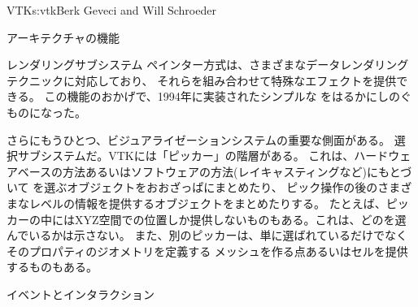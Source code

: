 \begin{aosachapter}{VTK}{s:vtk}{Berk Geveci and Will Schroeder}
\begin{aosasect1}{アーキテクチャの機能}
\begin{aosasect2}{レンダリングサブシステム}
ペインター方式は、さまざまなデータレンダリングテクニックに対応しており、
それらを組み合わせて特殊なエフェクトを提供できる。
この機能のおかげで、1994年に実装されたシンプルな
をはるかにしのぐものになった。

さらにもうひとつ、ビジュアライゼーションシステムの重要な側面がある。
選択サブシステムだ。VTKには「ピッカー」の階層がある。
これは、ハードウェアベースの方法あるいはソフトウェアの方法(レイキャスティングなど)にもとづいて
を選ぶオブジェクトをおおざっぱにまとめたり、
ピック操作の後のさまざまなレベルの情報を提供するオブジェクトをまとめたりする。
たとえば、ピッカーの中にはXYZ空間での位置しか提供しないものもある。これは、どのを選んでいるかは示さない。
また、別のピッカーは、単に選ばれているだけでなくそのプロパティのジオメトリを定義する
メッシュを作る点あるいはセルを提供するものもある。

\end{aosasect2}

\begin{aosasect2}{イベントとインタラクション}


\end{aosasect2}
\end{aosasect1}
\end{aosachapter}
